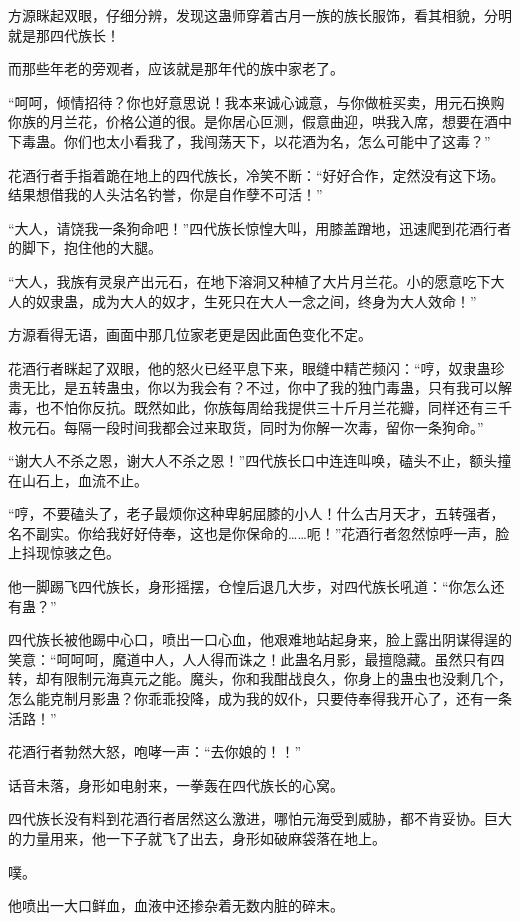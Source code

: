 \begin{this_body}
方源眯起双眼，仔细分辨，发现这蛊师穿着古月一族的族长服饰，看其相貌，分明就是那四代族长！

而那些年老的旁观者，应该就是那年代的族中家老了。

“呵呵，倾情招待？你也好意思说！我本来诚心诚意，与你做桩买卖，用元石换购你族的月兰花，价格公道的很。是你居心叵测，假意曲迎，哄我入席，想要在酒中下毒蛊。你们也太小看我了，我闯荡天下，以花酒为名，怎么可能中了这毒？”

花酒行者手指着跪在地上的四代族长，冷笑不断：“好好合作，定然没有这下场。结果想借我的人头沽名钓誉，你是自作孽不可活！”

“大人，请饶我一条狗命吧！”四代族长惊惶大叫，用膝盖蹭地，迅速爬到花酒行者的脚下，抱住他的大腿。

“大人，我族有灵泉产出元石，在地下溶洞又种植了大片月兰花。小的愿意吃下大人的奴隶蛊，成为大人的奴才，生死只在大人一念之间，终身为大人效命！”

方源看得无语，画面中那几位家老更是因此面色变化不定。

花酒行者眯起了双眼，他的怒火已经平息下来，眼缝中精芒频闪：“哼，奴隶蛊珍贵无比，是五转蛊虫，你以为我会有？不过，你中了我的独门毒蛊，只有我可以解毒，也不怕你反抗。既然如此，你族每周给我提供三十斤月兰花瓣，同样还有三千枚元石。每隔一段时间我都会过来取货，同时为你解一次毒，留你一条狗命。”

“谢大人不杀之恩，谢大人不杀之恩！”四代族长口中连连叫唤，磕头不止，额头撞在山石上，血流不止。

“哼，不要磕头了，老子最烦你这种卑躬屈膝的小人！什么古月天才，五转强者，名不副实。你给我好好侍奉，这也是你保命的……呃！”花酒行者忽然惊呼一声，脸上抖现惊骇之色。

他一脚踢飞四代族长，身形摇摆，仓惶后退几大步，对四代族长吼道：“你怎么还有蛊？”

四代族长被他踢中心口，喷出一口心血，他艰难地站起身来，脸上露出阴谋得逞的笑意：“呵呵呵，魔道中人，人人得而诛之！此蛊名月影，最擅隐藏。虽然只有四转，却有限制元海真元之能。魔头，你和我酣战良久，你身上的蛊虫也没剩几个，怎么能克制月影蛊？你乖乖投降，成为我的奴仆，只要侍奉得我开心了，还有一条活路！”

花酒行者勃然大怒，咆哮一声：“去你娘的！！”

话音未落，身形如电射来，一拳轰在四代族长的心窝。

四代族长没有料到花酒行者居然这么激进，哪怕元海受到威胁，都不肯妥协。巨大的力量用来，他一下子就飞了出去，身形如破麻袋落在地上。

噗。

他喷出一大口鲜血，血液中还掺杂着无数内脏的碎末。


\end{this_body}
